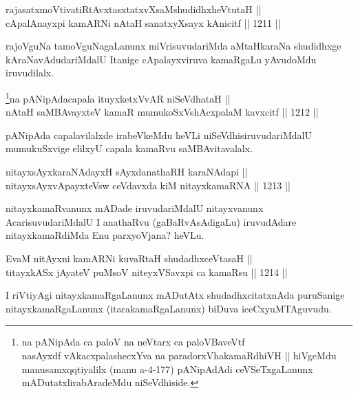 \begin{shl}
rajasatxmoVtivatiRtAvxtasxtatxvXsaMshudidhxheVtutaH || \\
cApalAnayxpi kamARNi nAtaH sanatxyXsayx kAnicitf \hfill || 1211 ||  
\end{shl}

\begin{artha}
rajoVguNa tamoVguNagaLanunx miVrisuvudariMda aMtaHkaraNa shudidhxge kAraNavAdudariMdalU Itanige cApalayxviruva kamaRgaLu yAvudoMdu iruvudilalx.
\end{artha}


\begin{shl}
\footnote{na pANipAda ca paloV na neVtarx ca paloVBaveVtf\\
nasAyxdf vAkacxpalashecxYva na paradorxVhakamaRdhiVH || hiVgeMdu manusamxqqtiyalilx (manu a-4-177) pANipAdAdi ceVSeTxgaLanunx mADutatxlirabAradeMdu niSeVdhiside.}na pANipAdacapala ituyxketxVvAR niSeVdhataH || \\
nAtaH saMBAvayxteV kamaR mumukoSxVshAcxpalaM kavxcitf \hfill || 1212 ||  
\end{shl}

\begin{artha}
pANipAda capalavilalxde irabeVkeMdu heVLi niSeVdhisiruvudariMdalU mumukuSxvige elilxyU capala kamaRvu saMBAvitavalalx.
\end{artha}

\begin{shl}
nitayxsAyxkaraNAdayxH sAyxdanathaRH karaNAdapi || \\
nitayxsAyxvApayxteV\s sw ceVdavxda kiM nitayxkamaRNA \hfill || 1213 ||  
\end{shl}

\begin{artha}
nitayxkamaRvanunx mADade iruvudariMdalU nitayxvanunx AcarisuvudariMdalU I anathaRvu (gaBaRvAsAdigaLu) iruvudAdare nitayxkamaRdiMda Enu parxyoVjana? heVLu.
\end{artha}

\begin{shl}
EvaM nitAyxni kamARNi kuvaRtaH shudadhxceVtasaH || \\
titayxkASx jAyateV puMsoV niteyxVSavxpi ca kamaRsu \hfill || 1214 ||  
\end{shl}

\begin{artha}
I riVtiyAgi nitayxkamaRgaLanunx mADutAtx shudadhxcitatxnAda puruSanige nitayxkamaRgaLanunx (itarakamaRgaLanunx) biDuva iceCxyuMTAguvudu.
\end{artha}

